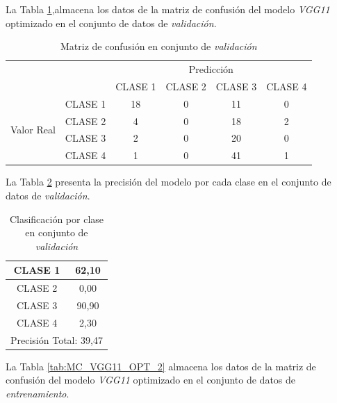 \newpage
La Tabla \ref{tab:MC_VGG11_OPT},almacena los datos de la matriz de confusión del modelo \textit{VGG11} optimizado en el conjunto de datos de \textit{validación}.

\begin{table}[htbp]
	\centering
	\resizebox{11cm}{!} {
	\begin{tabular}{|c|l|c|c|c|c|}
		\hline
		\multicolumn{2}{|c|}{\multirow{2}[4]{*}{}} & \multicolumn{4}{c|}{Predicción} \bigstrut\\
		\cline{3-6}    \multicolumn{2}{|c|}{} & CLASE 1 & CLASE 2 & CLASE 3 & CLASE 4 \bigstrut\\
		\hline
		\multirow{4}[8]{*}{\begin{sideways}Valor Real\end{sideways}} & CLASE 1 & 18     & 0     & 11    & 0 \bigstrut\\
		\cline{2-6}          & CLASE 2 & 4     & 0     & 18    & 2 \bigstrut\\
		\cline{2-6}          & CLASE 3 & 2     & 0     & 20    & 0 \bigstrut\\
		\cline{2-6}          & CLASE 4 & 1     & 0     & 41    & 1 \bigstrut\\
		\hline
	\end{tabular}
	}
	\caption{Matriz de confusión en conjunto de \textit{validación}}
	\label{tab:MC_VGG11_OPT}%
\end{table}%

La Tabla \ref{tab:VGG11optclases} presenta la precisión del modelo por cada clase en el conjunto de datos de \textit{validación}.

\begin{table}[htbp]
	\centering
	\begin{tabular}{|c|c|}
		\hline
		CLASE 1 & 62,10 \bigstrut\\
		\hline
		CLASE 2 & 0,00 \bigstrut\\
		\hline
		CLASE 3 & 90,90 \bigstrut\\
		\hline
		CLASE 4 & 2,30 \bigstrut\\
		\hline
		\multicolumn{2}{|c|}{Precisión Total: 39,47} \bigstrut\\
		\hline
	\end{tabular}%
	\caption{Clasificación por clase en conjunto de \textit{validación}}
	\label{tab:VGG11optclases}%
\end{table}%

La Tabla \ref{tab:MC_VGG11_OPT_2} almacena los datos de la matriz de confusión del modelo \textit{VGG11} optimizado en el conjunto de datos de \textit{entrenamiento}.

